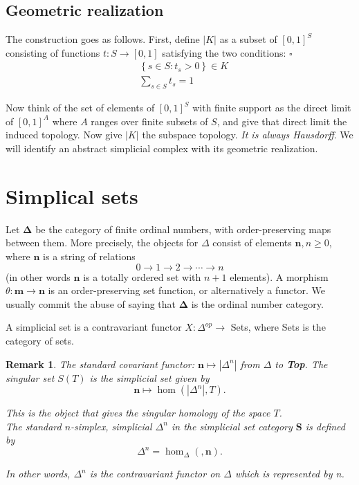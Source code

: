 \documentclass{book}
\newtheorem{rema}{Remark}
\begin{document}
\subsection*{Geometric realization}

The construction goes as follows. First, define $|K|$ as a subset of $[0,1]^S$ consisting of functions $t: S \rightarrow[0,1]$ satisfying the two conditions: $\square$
$$
\begin{aligned}
& \left\{s \in S: t_s>0\right\} \in K \\
& \sum_{s \in S} t_s=1
\end{aligned}
$$

Now think of the set of elements of $[0,1]^S$ with finite support as the direct limit of $[0,1]^A$ where $A$ ranges over finite subsets of $S$, and give that direct limit the induced topology. Now give $|K|$ the subspace topology. \textit{It is always Hausdorff}. We will identify an abstract simplicial complex with its geometric realization.





\section{Simplical sets}



Let $\mathbf{\Delta}$ be the category of finite ordinal numbers, with order-preserving maps between them. More precisely, the objects for $\Delta$ consist of elements $\mathbf{n}, n \geq 0$, where $\mathbf{n}$ is a string of relations
$$
0 \rightarrow 1 \rightarrow 2 \rightarrow \cdots \rightarrow n
$$
(in other words $\mathbf{n}$ is a totally ordered set with $n+1$ elements). A morphism $\theta: \mathbf{m} \rightarrow \mathbf{n}$ is an order-preserving set function, or alternatively a functor. We usually commit the abuse of saying that $\mathbf{\Delta}$ is the ordinal number category.

A simplicial set is a contravariant functor $X: \Delta^{o p} \rightarrow$ Sets, where Sets is the category of sets.

\begin{rema}
    The standard covariant functor: $\mathbf{n} \mapsto |\Delta^n| $ from $\Delta$ to \textbf{Top}. The singular set $S(T)$ is the simplicial set given by
    $$
    \mathbf{n} \mapsto \operatorname{hom}\left(\left|\Delta^n\right|, T\right) .
    $$
    
    This is the object that gives the singular homology of the space $T$.\\

    The standard $n$-simplex, simplicial $\Delta^n$ in the simplicial set category $\mathbf{S}$ is defined by
$$
\Delta^n=\operatorname{hom}_{\Delta}(, \mathbf{n}) .
$$

In other words, $\Delta^n$ is the contravariant functor on $\Delta$ which is represented by n.
\end{rema}
\end{document}
